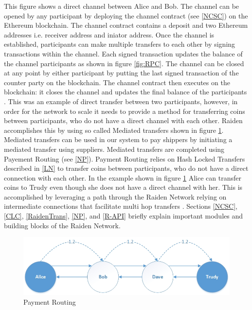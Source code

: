 This figure shows a direct channel between Alice and Bob. The channel can be opened by any participant by deploying the channel contract (see \ref{NCSC}) on the Ethereum blockchain. The channel contract contains a deposit and two Ethereum addresses i.e. receiver address and iniator address. Once the channel is established, participants can make multiple transfers to each other by signing transactions within the channel. Each signed transaction updates the balance of the channel participants as shown in figure \ref{fig:RPC}. The channel can be closed at any point by either participant by putting the last signed transaction of the counter party on the blockchain. The channel contract then executes on the blockchain: it closes the channel and updates the final balance of the participants \cite{rad:001}. This was an example of direct transfer between two participants, however, in order for the network to scale it needs to provide a method for transferring coins between participants, who do not have a direct channel with each other. Raiden accomplishes this by using so called Mediated transfers shown in figure \ref{fig:PaymentRouting}. Mediated transfers can be used in our system to pay shippers by initiating a mediated transfer using suppliers. Mediated transfers are completed using Payement Routing (see \ref{NP}). Payment Routing relies on Hash Locked Transfers described in \ref{LN} to transfer coins between participants, who do not have a direct connection with each other. In the example shown in figure \ref{fig:PaymentRouting} Alice can transfer coins to Trudy even though she does not have a direct channel with her. This is accomplished by leveraging a path through the Raiden Network relying on intermediate connections that facilitate multi hop transfers \cite{rad:001}.  Sections \ref{NCSC}, \ref{CLC}, \ref{RaidenTrans}, \ref{NP}, and \ref{R-API} briefly explain important modules and building blocks of the Raiden Network.

\begin{figure}[h]
	\centering
    \includegraphics[width=120mm,scale=1]{figs/PaymentRouting}
	\caption{Payment Routing}
	\label{fig:PaymentRouting}
\end{figure}
\vspace{0.5cm}

